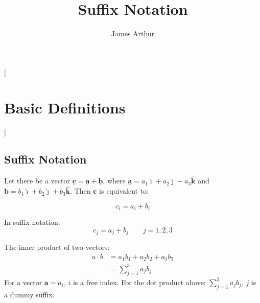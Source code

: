 \documentclass{article}
\title{Suffix Notation}
\author{James Arthur}
\renewcommand{\vec}[1]{\underline{\textbf{#1}}}
\newcommand{\veci}{\bm{\hat{\imath}}}
\newcommand{\vecj}{\bm{\hat{\jmath}}}
\newcommand{\veck}{\bm{\hat{k}}}
\begin{document}
\maketitle
\tableofcontents\newpage


[\section{Basic Definitions}]

\subsection{Suffix Notation}

Let there be a vector $\vec{c} = \vec{a} + \vec{b}$, where $\vec{a} = a_1 \veci + a_2 \vecj + a_3 \veck$ and $\vec{b} = {b}_1 \veci + {b}_2 \vecj + {b}_3 \veck$. Then $\vec{c} $ is equivalent to:

$$ c_i = a_i + b_i $$

In suffix notation:
$$ c_j = a_j + b_j \qquad j = 1, 2, 3 $$

The inner product of two vectors:
\begin{align*}
   a\cdot b &= a_1b_1 + a_2b_2 + a_3b_3\\
   &= \sum_{j=1}^3{a_jb_j}
\end{align*}
For a vector $\vec{a} = a_i$, $i$ is a free index. For the dot product above: $\displaystyle{\sum_{j=1}^3{a_jb_j}} $, $j $ is a dummy suffix.
\end{document}
